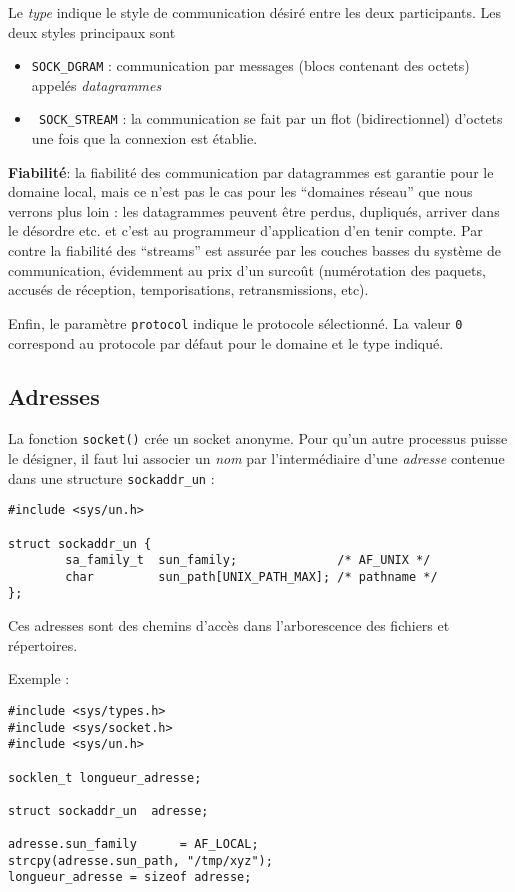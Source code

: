 Le \emph{type} indique le style de communication désiré
entre les deux participants. Les deux styles principaux sont
\begin{itemize}
\item \texttt{SOCK\_DGRAM} : communication par messages (blocs contenant des
octets) appelés \emph{datagrammes}
\item \texttt{ SOCK\_STREAM} : la communication se fait par un flot 
(bidirectionnel) d'octets une fois que la connexion est établie.
\end{itemize}

\textbf{Fiabilité}: la fiabilité des communication par datagrammes est
garantie pour le domaine local, mais ce n'est pas le cas pour les
``domaines réseau'' que nous verrons plus loin : les datagrammes
peuvent être perdus, dupliqués, arriver dans le désordre etc. et c'est
au programmeur d'application d'en tenir compte. Par contre la
fiabilité des ``streams'' est assurée par les couches basses du
système de communication, évidemment au prix d'un surcoût
(numérotation des paquets, accusés de réception, temporisations,
retransmissions, etc).


Enfin, le paramètre \texttt{protocol} indique le protocole sélectionné.
La valeur \texttt{0} correspond au protocole par défaut pour le domaine
et le type indiqué.

\subsection{Adresses}

La fonction \texttt{socket()} crée un socket anonyme. Pour qu'un autre
processus puisse le désigner, il faut lui associer un \emph{nom} par
l'intermédiaire d'une \emph{adresse} contenue dans une structure
\texttt{sockaddr\_un} :



\extrait
\begin{lstlisting}
#include <sys/un.h>

struct sockaddr_un {
        sa_family_t  sun_family;              /* AF_UNIX */
        char         sun_path[UNIX_PATH_MAX]; /* pathname */
};
\end{lstlisting}

Ces adresses sont des chemins d'accès dans l'arborescence des fichiers et
répertoires.


Exemple :

\extrait
\begin{lstlisting}
#include <sys/types.h>
#include <sys/socket.h>
#include <sys/un.h>

socklen_t longueur_adresse;

struct sockaddr_un  adresse;

adresse.sun_family      = AF_LOCAL;
strcpy(adresse.sun_path, "/tmp/xyz");
longueur_adresse = sizeof adresse;
\end{lstlisting}

